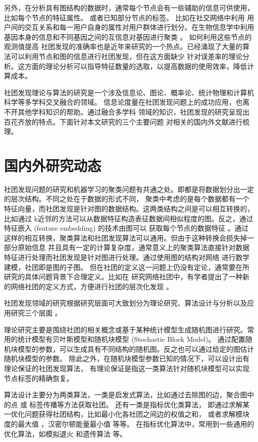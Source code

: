 另外，在分析具有图结构的数据时，通常每个节点会有一些辅助的信息可供使用，比如每个节点的特征属性。
或者已知部分节点的标签。
比如在社交网络中利用
用户间的交互关系和每一用户自身的属性对用户群体进行划分。在生物信息学中利用
基因本身的信息和不同基因之间的互信息对基因进行聚类 \cite{4359897}。
如何利用这些节点的观测值提高
社团发现的准确率也是近年来研究的一个热点。已经涌现了大量的算法可以利用节点和图的信息进行社团发现，但在这方面缺少
针对误差率的理论分析。这方面的理论分析可以指导特征数量的选取，以提高数据的使用效率，降低计算成本。



社团发现理论与算法的研究是一个涉及信息论、图论、概率论、统计物理和计算机科学等多学科交叉融合的领域。
信息论度量在社团发现问题上的成功应用，也离不开其他学科知识的帮助。通过融合多学科
领域的知识，社团发现的研究呈现出百花齐放的特点。下面针对本文研究的三个主要问题
对相关的国内外文献进行梳理。

\section{国内外研究动态}
社团发现问题的研究和机器学习的聚类问题有共通之处。即都是将数据划分出一定的层次结构。不同之处在于数据的形式不同，
聚类中考虑的是每个数据都有一个特征向量，而社团发现是针对图的数据结构。这两类结构之间是可以相互转换的，比如通过
k近邻的方法可以从数据特征构造表征数据间相似程度的图。反之，通过特征嵌入 (feature embedding) 的技术由图可以
获取每个节点的数据特征 \cite{hamilton2017representation}。通过这样的相互转换，聚类算法和社团发现算法可以通用。但由于这种转换会损失掉一部分原始信息
并且具有一定的计算复杂度，通常意义上的聚类算法直接针对数据特征进行处理而社团发现是针对图进行处理。通过使用图的结构对网络
进行数学建模，社团即是图的子图。
但在社团的定义这一问题上仍没有定论，通常要在所研究的具体问题背景下合理定义。比如在
研究网络社团中，有学者提出了一种新的网络社团的定义方式，方便进行社团的层次化发现
\cite{alphabetaclustering2019}。

社团发现领域的研究根据研究层面可大致划分为理论研究、算法设计与分析以及应用研究三个层面
\cite{ZJSH201102017}。

理论研究主要是围绕社团的相关概念或基于某种统计模型生成随机图进行研究。常用的统计模型有贝叶斯模型和随机块模型 (Stochastic Block Model)。
通过配置随机块模型的参数，可以生成具有不同结构的随机图。反之也可以通过给定的图估计随机块模型的参数\cite{RJXB201609005}。
除此之外，在随机块模型参数已知的情况下，可以设计出有理论保证的社团发现算法，
有理论保证是指这一类算法针对随机块模型可以实现节点标签的精确恢复。

算法设计主要分为两类算法，一类是启发式算法，比如通过去除图的边\cite{girvan2002community}，聚合图中的点 \cite{clauset2004finding}或
标签传播\cite{raghavan2007near}等方法获取社团。
还有一类是指标优化类算法，
即通过求解某一优化问题获得社团结构，比如最小化各社团之间边的权值之和，
或者求解模块度的最大值 \cite{newman2006modularity}，汉密尔顿能量最小值
\cite{PhysRevLett.93.218701} 等等。
在指标优化算法中，常用到一些通用的优化算法，如模拟退火\cite{PhysRevE.71.046101}
和遗传算法 \cite{pizzuti2008ga}等。

